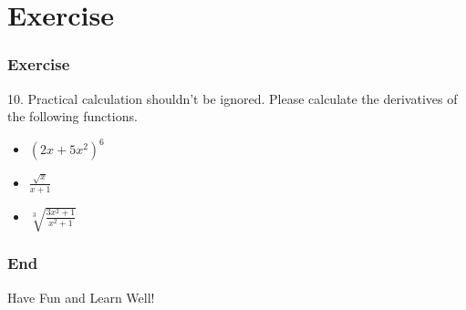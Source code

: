 \documentclass[12pt, t]{beamer}
\begin{document}
\section{Exercise}
\begin{frame}
    \frametitle{Exercise}
    10. Practical calculation shouldn't be ignored. Please calculate the derivatives of the following functions.
    \begin{itemize}
        \item $(2x+5x^2)^6$
              \vspace{0.3em}
        \item $\frac{\sqrt{x}}{x+1}$
              \vspace{0.3em}
        \item $\sqrt[3]{\frac{3x^2+1}{x^2+1}}$
    \end{itemize}

\end{frame}

\begin{frame}
    \frametitle{End}
    \vspace{2cm}
    \Huge \center  Have Fun and Learn Well!
\end{frame}
\end{document}
